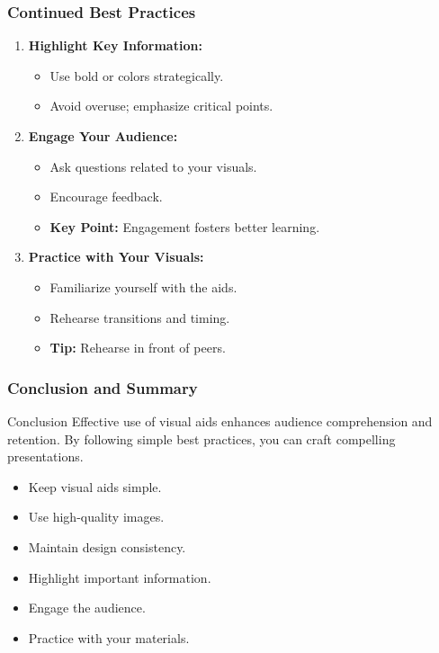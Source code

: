 \documentclass[aspectratio=169]{beamer}
\begin{document}
\begin{frame}[fragile]
    \frametitle{Continued Best Practices}

    \begin{enumerate}[continue]
        \item \textbf{Highlight Key Information:}
            \begin{itemize}
                \item Use bold or colors strategically.
                \item Avoid overuse; emphasize critical points.
            \end{itemize}
        
        \item \textbf{Engage Your Audience:}
            \begin{itemize}
                \item Ask questions related to your visuals.
                \item Encourage feedback.
                \item \textbf{Key Point:} Engagement fosters better learning.
            \end{itemize}
        
        \item \textbf{Practice with Your Visuals:}
            \begin{itemize}
                \item Familiarize yourself with the aids.
                \item Rehearse transitions and timing.
                \item \textbf{Tip:} Rehearse in front of peers.
            \end{itemize}
    \end{enumerate}
\end{frame}

\begin{frame}[fragile]
    \frametitle{Conclusion and Summary}

    \begin{block}{Conclusion}
        Effective use of visual aids enhances audience comprehension and retention. By following simple best practices, you can craft compelling presentations.
    \end{block}
    
    \begin{itemize}
        \item Keep visual aids simple.
        \item Use high-quality images.
        \item Maintain design consistency.
        \item Highlight important information.
        \item Engage the audience.
        \item Practice with your materials.
    \end{itemize}
\end{frame}
\end{document}
